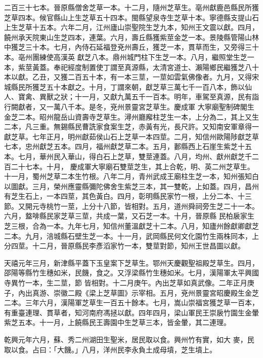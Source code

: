 \begin{pinyinscope}
 二百三十七本。晉原縣僧舍芝草一本。十二月，隨州芝草生。亳州獻鹿邑縣民所獲芝草四本。候官縣山上生芝草五十四本。閩縣望泉寺生芝草十本。寧德縣支提山石上生芝草十五本。六年二月，江州廬山崇聖院生芝九本，知州王文震以獻。四月，饒州承天院東山生芝四本，連葉。六月，壽丘縣獲紫莖金芝一本。景陵縣管陽山林中獲芝三十本。七月，內侍石延福登兗州壽丘，獲芝一本，貫草而生，又旁得三十本。亳州團練使高漢英
 獻芝八本。鼎州城門柱下生芝一本。八月，繼照堂生芝一本，紫莖黃蓋。奉祀經度制置使丁謂至真源縣，太清宮道士、瀨陽鄉民繼獲芝八十本以獻。乙丑，又獲二百五十本，有一本三莖，一莖如雲氣佛像者。九月，又得宋城縣民所獲芝五十本獻之。十月，丁謂來朝，獻芝草三萬七千一百八本，飾以仙人、寶禽、異獸之狀；十一月，又獻九萬五千一百本。明年，車駕至真源，民有詣行闕獻者，又一萬八千本。是冬，兗州景靈宮芝草生。慶成軍
 大寧廟聖制碑閣生金芝二本。昭州龍岳山資壽寺芝草生。潯州廳廨柱芝生一本，上分為二，其上又生二本，凡三重。無錫縣民曹詵家食案生芝，赤黃有光，長尺許。又知南安軍章得一獻芝草。七年正月，明州獻茹侯山石上芝草一本四莖。二月，知信州歐陽陟獻芝草七本，忠州獻芝五本。四月，福州獻芝草二本。五月，郪縣西上石崖生紫芝十五本。七月，華州民入華山，得白石上芝草，雙莖連蓋。八月，均州、獻州獻芝千二百二十七本。十月，
 慶成軍大寧廟石雙莖芝生，其上合乾，明、英二州芝草生。十一月，蜀州芝草二本生竹根。八年二月，青州武成王廟柱生芝一本，知州張知白以圖獻。三月，榮州應靈縣彌陀佛舍生紫芝三本，其一雙乾，上如蓋。四月，昌州有芝生石上，一本四莖，其色黃白。四月，彰明縣民家竹一根，上分二本、十三節。又開元寺桃竹一莖，上分十八節，皆相對。五月，道州舜祠旁生芝二十一本。六月，盩啡縣民家芝草三莖，共成一葉，又石芝一本。十月，晉原縣
 民柏扆家生芝三根，合為一本。九年七月，知信州董溫獻芝十二本。八月，知廬州餘獻卿獻芝二本。九月，涪城縣石壁生芝一本。十一月，武岡縣民何文化園竹生兩株同本，上分四莖。十二月，晉原縣民李彥滔家竹一本，雙莖對節，知州王世昌圖以獻。



 天禧元年三月，新津縣平蓋下玉皇案下芝草生。鄂州天慶觀聖祖殿芝草生。四月，邵陽等縣竹生穗如米，民饑，食之。又浮梁縣竹生穗如米。七月，漢陽軍太平興國寺異竹一本，生二莖，節
 皆相對。十二月庚午。內出芝草如真武像。二年正月庚子，內出真游、崇徽二殿《梁上芝草圖》示宰相。五月，兗州景靈宮昭慶殿生金芝二本。三年六月，漢陽軍芝草生一百五十餘本。七月，嵩山崇福宮獲芝草一百本，有重臺連理、貫草者，知河南府馮拯以獻。四年四月，梁山軍民王崇扆竹園生金暈紫芝五本。十一月，上饒縣民王壽園中生芝草三本，皆金暈，其二連理。



 乾興元年六月，蘇、秀二州湖田生聖米，居民取以食。興州竹有實，如大
 麥，民取以食。占曰：「大饑。」八月，洋州民李永負土成母墳，芝生墳上。




\end{pinyinscope}
